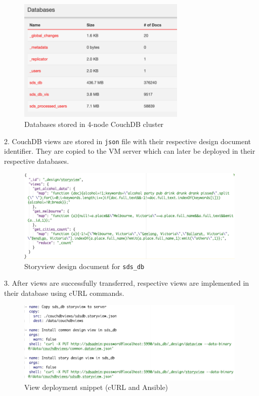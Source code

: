 \begin{figure}[H]
    \centering
    \includegraphics[width=8cm,keepaspectratio=true]{images/deployment/couchdb_databases.png}
    \caption{Databases stored in 4-node CouchDB cluster}
    \label{fig:couchdatabases}
\end{figure}

2. CouchDB views are stored in \texttt{json} file with their respective design document identifier. They are copied to the VM server which can later be deployed in their respective databases.

\begin{figure}[H]
    \centering
    \includegraphics[width=11cm,keepaspectratio=true]{images/deployment/couchdb_view_json.png}
    \caption{Storyview design document for \texttt{sds\_db}}
    \label{fig:couchview1}
\end{figure}

3. After views are successfully transferred, respective views are implemented in their database using cURL commands.

\begin{figure}[H]
    \centering
    \includegraphics[width=11cm,keepaspectratio=true]{images/deployment/couchdb_view_deployment.png}
    \caption{View deployment snippet (cURL and Ansible)}
    \label{fig:couchview2}
\end{figure}
